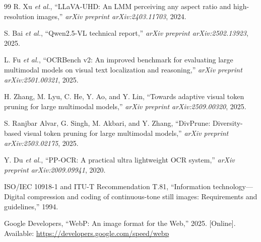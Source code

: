 \documentclass[conference]{IEEEtran}
\begin{document}
\begin{thebibliography}{99}
 R. Xu \emph{et al.}, ``LLaVA-UHD: An LMM perceiving any aspect ratio and high-resolution images,'' \emph{arXiv preprint arXiv:2403.11703}, 2024.

 S. Bai \emph{et al.}, ``Qwen2.5-VL technical report,'' \emph{arXiv preprint arXiv:2502.13923}, 2025.

 L. Fu \emph{et al.}, ``OCRBench v2: An improved benchmark for evaluating large multimodal models on visual text localization and reasoning,'' \emph{arXiv preprint arXiv:2501.00321}, 2025.

 H. Zhang, M. Lyu, C. He, Y. Ao, and Y. Lin, ``Towards adaptive visual token pruning for large multimodal models,'' \emph{arXiv preprint arXiv:2509.00320}, 2025.

 S. Ranjbar Alvar, G. Singh, M. Akbari, and Y. Zhang, ``DivPrune: Diversity-based visual token pruning for large multimodal models,'' \emph{arXiv preprint arXiv:2503.02175}, 2025.

 Y. Du \emph{et al.}, ``PP-OCR: A practical ultra lightweight OCR system,'' \emph{arXiv preprint arXiv:2009.09941}, 2020.

 ISO/IEC 10918-1 and ITU-T Recommendation T.81, ``Information technology---Digital compression and coding of continuous-tone still images: Requirements and guidelines,'' 1994.

 Google Developers, ``WebP: An image format for the Web,'' 2025. [Online]. Available: \url{https://developers.google.com/speed/webp}

\end{thebibliography}
\end{document}

